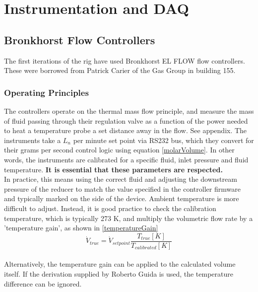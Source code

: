 \documentclass{report}
\begin{document}
\section{Instrumentation and DAQ}
\subsection{Bronkhorst Flow Controllers}
The first iterations of the rig have used Bronkhorst EL FLOW flow controllers. These were borrowed from Patrick Carier of the Gas Group in building 155. 
 
\subsubsection{Operating Principles} \label{sec:operatingPrinciples}
The controllers operate on the thermal mass flow principle, and measure the mass of fluid passing through their regulation valve as a function of the power needed to heat a temperature probe a set distance away in the flow. See appendix. The instruments take a $L_n$ per minute set point via RS232 bus, which they convert for their grams per second control logic using equation \eqref{molarVolume}. In other words, the instruments are calibrated for a specific fluid, inlet pressure and fluid temperature. \textbf{It is essential that these parameters are respected.}
\\
In practice, this means using the correct fluid and adjusting the downstream pressure of the reducer to match the value specified in the controller firmware and typically marked on the side of the device. Ambient temperature is more difficult to adjust. Instead, it is good practice to check the calibration temperature, which is typically 273 K, and multiply the volumetric flow rate by a 'temperature gain', as shown in \eqref{temperatureGain}
\begin{equation} \label{temperatureGain}
\dot{V}_{true} = \dot{V}_{set point}\frac{T_{true}[K]}{T_{calibrated}[K]}
\end{equation}
\\
Alternatively, the temperature gain can be applied to the calculated volume itself. If the derivation supplied by Roberto Guida is used, the temperature difference can be ignored. \\
\end{document}
